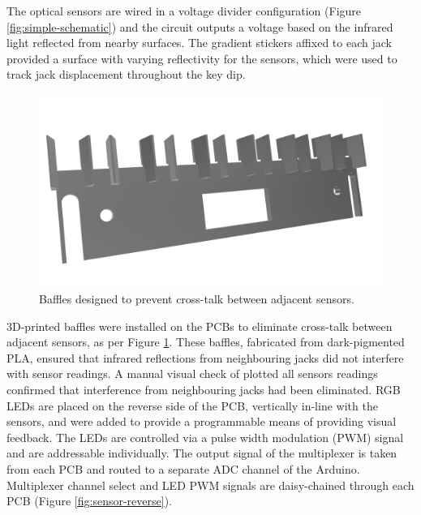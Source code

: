 The optical sensors are wired in a voltage divider configuration (Figure \ref{fig:simple-schematic}) and the circuit outputs a voltage based on the infrared light reflected from nearby surfaces. 
The gradient stickers affixed to each jack provided a surface with varying reflectivity for the sensors, which were used to track jack displacement throughout the key dip. 

\begin{figure}[!t]
    \centering
    \includegraphics[width=0.8\linewidth,trim={0 2cm 0 2.5cm},clip]{src/images/baffles.png}
    \caption{Baffles designed to prevent cross-talk between adjacent sensors.}
    \label{fig:baffles}
\end{figure}

3D-printed baffles were installed on the PCBs to eliminate cross-talk between adjacent sensors, as per Figure \ref{fig:baffles}. These baffles, fabricated from dark-pigmented PLA, ensured that infrared reflections from neighbouring jacks did not interfere with sensor readings. A manual visual check of plotted all sensors readings confirmed that interference from neighbouring jacks had been eliminated. RGB LEDs are placed on the reverse side of the PCB, vertically in-line with the sensors, and were added to provide a programmable means of providing visual feedback. The LEDs are controlled via a pulse width modulation (PWM) signal and are addressable individually.
The output signal of the multiplexer is taken from each PCB and routed to a separate ADC channel of the Arduino. Multiplexer channel select and LED PWM signals are daisy-chained through each PCB (Figure \ref{fig:sensor-reverse}).

